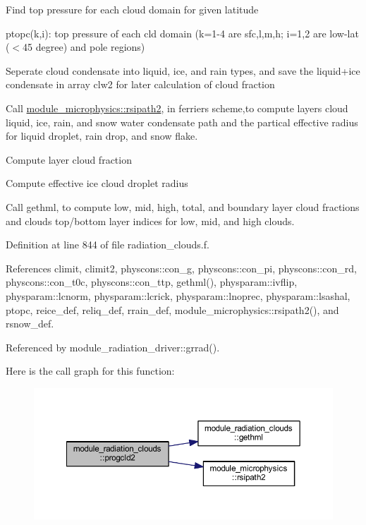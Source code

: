 \begin{DoxyEnumerate}
\item Find top pressure for each cloud domain for given latitude
\begin{DoxyItemize}
\item ptopc(k,i)\+: top pressure of each cld domain (k=1-\/4 are sfc,l,m,h; i=1,2 are low-\/lat ($<$45 degree) and pole regions)
\end{DoxyItemize}
\item Seperate cloud condensate into liquid, ice, and rain types, and save the liquid+ice condensate in array clw2 for later calculation of cloud fraction
\item Call \hyperlink{namespacemodule__microphysics_ac80bc526194e30c9e1a97e7833a2a77f}{module\+\_\+microphysics\+::rsipath2}, in ferrier\textquotesingle{}s scheme,to compute layer\textquotesingle{}s cloud liquid, ice, rain, and snow water condensate path and the partical effective radius for liquid droplet, rain drop, and snow flake.
\item Compute layer cloud fraction
\item Compute effective ice cloud droplet radius
\item Call gethml, to compute low, mid, high, total, and boundary layer cloud fractions and clouds top/bottom layer indices for low, mid, and high clouds. 
\end{DoxyEnumerate}

Definition at line 844 of file radiation\+\_\+clouds.\+f.



References climit, climit2, physcons\+::con\+\_\+g, physcons\+::con\+\_\+pi, physcons\+::con\+\_\+rd, physcons\+::con\+\_\+t0c, physcons\+::con\+\_\+ttp, gethml(), physparam\+::ivflip, physparam\+::lcnorm, physparam\+::lcrick, physparam\+::lnoprec, physparam\+::lsashal, ptopc, reice\+\_\+def, reliq\+\_\+def, rrain\+\_\+def, module\+\_\+microphysics\+::rsipath2(), and rsnow\+\_\+def.



Referenced by module\+\_\+radiation\+\_\+driver\+::grrad().



Here is the call graph for this function\+:
\nopagebreak
\begin{figure}[H]
\begin{center}
\leavevmode
\includegraphics[width=350pt]{namespacemodule__radiation__clouds_a2f45f48505bb69a968c788ff680b5642_cgraph}
\end{center}
\end{figure}




